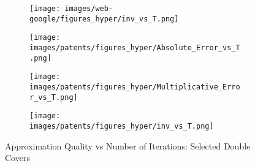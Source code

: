 \begin{figure*}[htbp]
\begin{subfigure}[b]{\textwidth}
\begin{minipage}[b]{0.3\textwidth}
		\texttt{[image: images/web-google/figures\_hyper/inv\_vs\_T.png]} %
	\end{minipage}
	\end{subfigure}
		\begin{subfigure}[b]{\textwidth}
		\centering
		\begin{minipage}[b]{0.05\textwidth}
			\centering
		\end{minipage}%
		\begin{minipage}[b]{0.3\textwidth}
			\centering
			\texttt{[image: images/patents/figures\_hyper/Absolute\_Error\_vs\_T.png]} %
			
		\end{minipage}%
		\begin{minipage}[b]{0.3\textwidth}
			\centering
			\texttt{[image: images/patents/figures\_hyper/Multiplicative\_Error\_vs\_T.png]} %
			
		\end{minipage}%
		\begin{minipage}[b]{0.3\textwidth}
			\centering
			\texttt{[image: images/patents/figures\_hyper/inv\_vs\_T.png]} %
		\end{minipage}
	\end{subfigure}
	\caption{Approximation Quality vs Number of Iterations: Selected Double Covers}
	\label{fig:erros_hyper}
\end{figure*}








